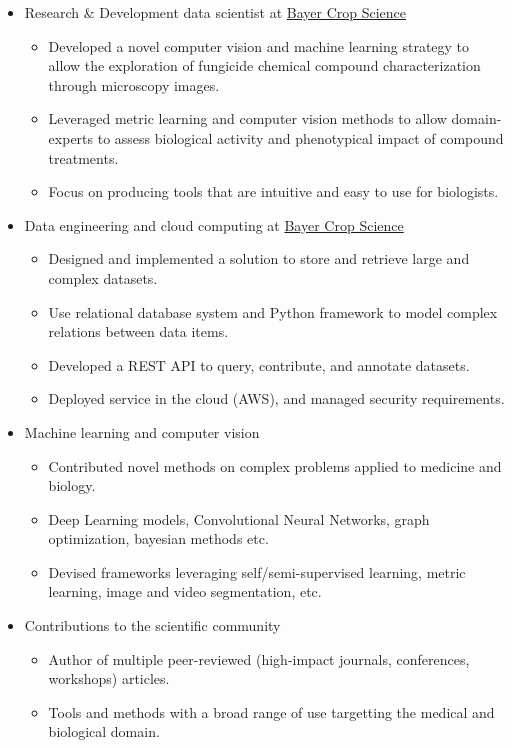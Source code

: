 \documentclass[12pt,a4paper]{awesome-cv}
\begin{document}
\begin{cvparagraph}
\begin{itemize}
\item Research \& Development data scientist at \href{https://www.bayer.com/en/agriculture}{Bayer Crop Science}
\begin{itemize}
\item Developed a novel computer vision and machine learning strategy to allow the exploration of fungicide chemical compound characterization through microscopy images.
\item Leveraged metric learning and computer vision methods to allow domain-experts to assess biological activity and phenotypical impact of compound treatments.
\item Focus on producing tools that are intuitive and easy to use for biologists.
\end{itemize}
\item Data engineering and cloud computing at \href{https://www.bayer.com/en/agriculture}{Bayer Crop Science}
\begin{itemize}
\item Designed and implemented a solution to store and retrieve large and complex datasets.
\item Use relational database system and Python framework to model complex relations between data items.
\item Developed a REST API to query, contribute, and annotate datasets.
\item Deployed service in the cloud (AWS), and managed security requirements.
\end{itemize}
\item Machine learning and computer vision
\begin{itemize}
\item Contributed novel methods on complex problems applied to medicine and biology.
\item Deep Learning models, Convolutional Neural Networks, graph optimization, bayesian methods etc.
\item Devised frameworks leveraging self/semi-supervised learning, metric learning, image and video segmentation, etc.
\end{itemize}
\item Contributions to the scientific community
\begin{itemize}
\item Author of multiple peer-reviewed (high-impact journals, conferences, workshops) articles.
\item Tools and methods with a broad range of use targetting the medical and biological domain.
\end{itemize}
\end{itemize}


\end{cvparagraph}
\end{document}
